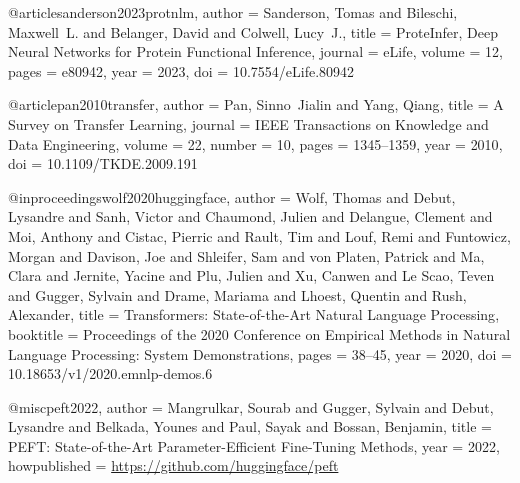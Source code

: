\documentclass{article}
\begin{document}

@article{sanderson2023protnlm,
  author    = {Sanderson, Tomas and Bileschi, Maxwell~L. and Belanger, David and
               Colwell, Lucy~J.},
  title     = {{ProteInfer}, Deep Neural Networks for Protein Functional Inference},
  journal   = {eLife},
  volume    = {12},
  pages     = {e80942},
  year      = {2023},
  doi       = {10.7554/eLife.80942}
}


@article{pan2010transfer,
  author    = {Pan, Sinno~Jialin and Yang, Qiang},
  title     = {A Survey on Transfer Learning},
  journal   = {{IEEE} Transactions on Knowledge and Data Engineering},
  volume    = {22},
  number    = {10},
  pages     = {1345--1359},
  year      = {2010},
  doi       = {10.1109/TKDE.2009.191}
}


@inproceedings{wolf2020huggingface,
  author    = {Wolf, Thomas and Debut, Lysandre and Sanh, Victor and
               Chaumond, Julien and Delangue, Clement and Moi, Anthony and
               Cistac, Pierric and Rault, Tim and Louf, Remi and
               Funtowicz, Morgan and Davison, Joe and Shleifer, Sam and
               {von Platen}, Patrick and Ma, Clara and Jernite, Yacine and
               Plu, Julien and Xu, Canwen and {Le Scao}, Teven and
               Gugger, Sylvain and Drame, Mariama and Lhoest, Quentin and
               Rush, Alexander},
  title     = {Transformers: State-of-the-Art Natural Language Processing},
  booktitle = {Proceedings of the 2020 Conference on Empirical Methods in
               Natural Language Processing: System Demonstrations},
  pages     = {38--45},
  year      = {2020},
  doi       = {10.18653/v1/2020.emnlp-demos.6}
}

@misc{peft2022,
  author       = {Mangrulkar, Sourab and Gugger, Sylvain and Debut, Lysandre and
                  Belkada, Younes and Paul, Sayak and Bossan, Benjamin},
  title        = {{PEFT}: State-of-the-Art Parameter-Efficient Fine-Tuning Methods},
  year         = {2022},
  howpublished = {\url{https://github.com/huggingface/peft}}
}
\end{document}
